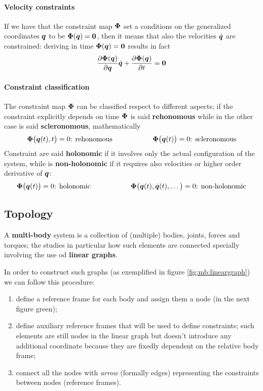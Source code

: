 	\paragraph{Velocity constraints} If we have  that the constraint map $\boldsymbol{\Phi}$ set a conditions on the generalized coordinates $\boldsymbol{q}$ to be $\boldsymbol{\Phi}(\boldsymbol{q}) = \boldsymbol{0}$, then it means that also the velocities $\dot{\boldsymbol{q}}$ are constrained: deriving in time $\boldsymbol{\Phi}( \boldsymbol{q} ) = \boldsymbol{0}$ results in fact
	\begin{equation}
		\frac{\partial \boldsymbol{\Phi} (\boldsymbol{q})}{\partial \boldsymbol{q}} \dot{\boldsymbol{q}} + \frac{\partial  \boldsymbol{\Phi}(\boldsymbol{q})}{\partial t} = \boldsymbol{0}
	\end{equation}

	\paragraph{Constraint classification} The constraint map $\boldsymbol{\Phi}$ can be classified respect to different aspects; if the constraint explicitly depends on time $\boldsymbol{\Phi}$ is said \textbf{rehonomous} while in the other case is said \textbf{scleronomous}, mathematically
	\[ \boldsymbol{\Phi}\big(\boldsymbol{q}(t), t\big) = 0 \textrm{: rehonomous} \hspace{2cm} \boldsymbol{\Phi}\big(\boldsymbol{q}(t)\big) = 0 \textrm{: scleronomous} \]
	Constraint are said \textbf{holonomic} if it involves only the actual configuration of the system, while is \textbf{non-holonomic} if it requires also velocities or higher order derivative of $\boldsymbol{q}$:
	\[ \boldsymbol{\Phi}\big(\boldsymbol{q}(t)\big) = 0 \textrm{: holonomic} \hspace{2cm} \boldsymbol{\Phi}\big(\boldsymbol{q}(t), \dot{\boldsymbol{q}}(t),\dots\big) = 0 \textrm{: non-holonomic} \]
	
\subsection{Topology}
	A \textbf{multi-body} system is a collection of (multiple) bodies, joints, forces and torques; the  studies in particular how such elements are connected specially involving the use od \textbf{linear graphs}.
	
	In order to construct such graphs (as exemplified in figure \ref{fig:mb:lineargraph}) we can follow this procedure:
	\begin{enumerate}
		\item define a reference frame for each body and assign them a node (in the next figure green);
		\item define auxiliary reference frames that will be used to define constraints; such elements are still nodes in the linear graph but doesn't introduce any additional coordinate because they are fixedly dependent on the relative body frame;
		\item connect all the nodes with \textit{arrow} (formally edges) representing the constraints between nodes (reference frames). 
	\end{enumerate}		

